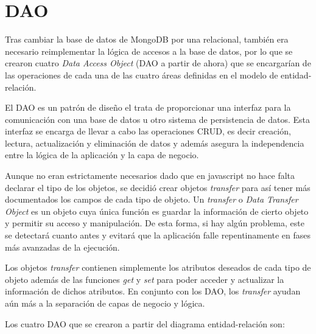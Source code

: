 \documentclass[11pt]{book}
\begin{document}
\chapter{DAO}\label{cap:daos}

Tras cambiar la base de datos de MongoDB por una relacional, también era necesario reimplementar la lógica de accesos a la base de datos, por lo que se crearon cuatro \emph{Data Access Object} (DAO a partir de ahora) que se encargarían de las operaciones de cada una de las cuatro áreas definidas en el modelo de entidad-relación.

El DAO es un patrón de diseño el trata de proporcionar una interfaz para la comunicación con una base de datos u otro sistema de persistencia de datos. Esta interfaz se encarga de llevar a cabo las operaciones CRUD, es decir creación, lectura, actualización y eliminación de datos y además asegura la independencia entre la lógica de la aplicación y la capa de negocio.

Aunque no eran estrictamente necesarios dado que en javascript no hace falta declarar el tipo de los objetos, se decidió crear objetos \emph{transfer} para así tener más documentados los campos de cada tipo de objeto.
Un \emph{transfer} o \emph{Data Transfer Object} es un objeto cuya única función es guardar la información de cierto objeto y permitir su acceso y manipulación.
De esta forma, si hay algún problema, este se detectará cuanto antes y evitará que la aplicación falle repentinamente en fases más avanzadas de la ejecución.

Los objetos \emph{transfer} contienen simplemente los atributos deseados de cada tipo de objeto además de las funciones \emph{get} y \emph{set} para poder acceder y actualizar la información de dichos atributos.
En conjunto con los DAO, los \emph{transfer} ayudan aún más a la separación de capas de negocio y lógica.

Los cuatro DAO que se crearon a partir del diagrama entidad-relación son:
\end{document}
